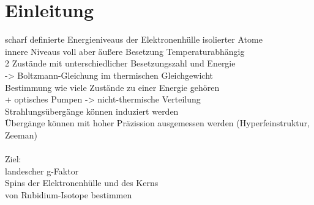 \section{Einleitung}

scharf definierte Energieniveaus der Elektronenhülle isolierter Atome\\
innere Niveaus voll aber äußere Besetzung Temperaturabhängig\\
2 Zustände mit unterschiedlicher Besetzungszahl und Energie\\
-> Boltzmann-Gleichung im thermischen Gleichgewicht\\
Bestimmung wie viele Zustände zu einer Energie gehören\\
+ optisches Pumpen -> nicht-thermische Verteilung\\
Strahlungsübergänge können induziert werden\\
Übergänge können mit hoher Präzission ausgemessen werden (Hyperfeinstruktur, Zeeman)\\
\\
Ziel:\\
landescher g-Faktor\\
Spins der Elektronenhülle und des Kerns\\
von Rubidium-Isotope bestimmen\\
